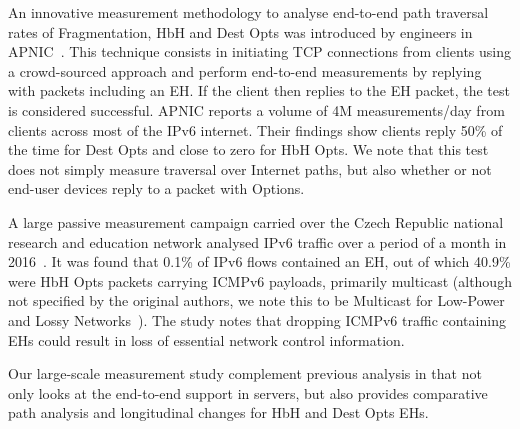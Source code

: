 \documentclass[conference]{IEEEtran}
\begin{document}
An innovative measurement methodology to analyse end-to-end path traversal
rates of Fragmentation, HbH and Dest Opts was introduced by engineers in
APNIC~\cite{apnic}.  This technique consists in initiating TCP connections from
clients using a crowd-sourced approach and perform end-to-end
measurements by replying with packets including an EH. If the client then replies to the EH packet, the test is considered successful.  APNIC reports a volume of 4M measurements/day from clients across most of the IPv6 internet. Their findings show clients reply 50\% of the time for Dest Opts and close to zero for HbH Opts. We note that this test does not simply measure traversal over Internet paths, but also whether or not end-user devices reply to a packet with Options. 


A large passive measurement campaign carried over the Czech Republic national
research and education network analysed IPv6 traffic over a period of a month in
2016~\cite{passive-threats}. It was found that 0.1\% of IPv6 flows
contained an EH, out of which 40.9\% were HbH Opts packets carrying ICMPv6
payloads, primarily multicast (although not specified by the original authors,
we note this to be Multicast for Low-Power and Lossy Networks~\cite{RFC7731}).
The study notes that dropping ICMPv6 traffic containing EHs could result in
loss of essential network control information. 


Our large-scale measurement study complement previous analysis in that not only
looks at the end-to-end support in servers, but also provides comparative path
analysis and longitudinal changes for HbH and Dest Opts EHs.
\end{document}
